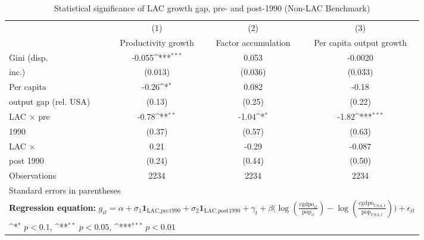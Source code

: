 \begin{table}[htbp]\centering
\def\sym#1{\ifmmode^{#1}\else\(^{#1}\)\fi}
\caption{Statistical significance of LAC growth gap, pre- and post-1990 (Non-LAC Benchmark)}
\begin{tabular}{l*{3}{c}}
\toprule
                &\multicolumn{1}{c}{(1)}&\multicolumn{1}{c}{(2)}&\multicolumn{1}{c}{(3)}\\
                &\multicolumn{1}{c}{Productivity growth}&\multicolumn{1}{c}{Factor accumulation}&\multicolumn{1}{c}{Per capita output growth}\\
\midrule
Gini (disp.     &   -0.055\sym{***}&    0.053         &  -0.0020         \\
inc.)           &  (0.013)         &  (0.036)         &  (0.033)         \\
\addlinespace
Per capita      &    -0.26\sym{*}  &    0.082         &    -0.18         \\
output gap (rel. USA)&   (0.13)         &   (0.25)         &   (0.22)         \\
\addlinespace
LAC $\times$ pre&    -0.78\sym{**} &    -1.04\sym{*}  &    -1.82\sym{***}\\
1990            &   (0.37)         &   (0.57)         &   (0.63)         \\
\addlinespace
LAC $\times$    &     0.21         &    -0.29         &   -0.087         \\
post 1990       &   (0.24)         &   (0.44)         &   (0.50)         \\
\midrule
Observations    &     2234         &     2234         &     2234         \\
\bottomrule
\multicolumn{4}{l}{\footnotesize Standard errors in parentheses}\\
\multicolumn{4}{l}{\footnotesize \textbf{Regression equation:} \(g_{it} = \alpha + \sigma_1 \mathbf{1}_{\textrm{LAC,pre1990}} + \sigma_2 \mathbf{1}_{\textrm{LAC,post1990}} + \gamma_t + \beta \big(\log (\frac{\textrm{cgdpo}_{it}}{\textrm{pop}_{it}} ) - \log (\frac{\textrm{cgdpo}_{USA,t}}{\textrm{pop}_{USA,t}}  ) \big) + \epsilon_{it}\)}\\
\multicolumn{4}{l}{\footnotesize \sym{*} \(p<0.1\), \sym{**} \(p<0.05\), \sym{***} \(p<0.01\)}\\
\end{tabular}
\end{table}
